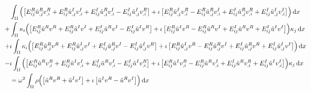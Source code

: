 \begin{align}
    & \int_{\Omega} {
        \Bigl(
            \left[
                E^R_{ij} \tilde{u}^R_{,j} v^R_{,i}
                + E^R_{ij} \tilde{u}^I_{,j} v^I_{,i}
                + E^I_{ij} \tilde{u}^R_{,j} v^I_{,i}
                - E^I_{ij} \tilde{u}^I_{,j} v^R_{,i}
            \right]
            + \iota \left[
                E^R_{ij} \tilde{u}^I_{,j} v^R_{,i}
                - E^R_{ij} \tilde{u}^R_{,j} v^I_{,i}
                + E^I_{ij} \tilde{u}^R_{,j} v^R_{,i}
                + E^I_{ij} \tilde{u}^I_{,j} v^I_{,i}
            \right]
        \Bigr)
        \,\mathrm{d}x
    } \nonumber \\
    +& \int_{\Omega} {
        \kappa_{i} \Bigl(
            \left[
                E^R_{ij} \tilde{u}^R v^R
                + E^R_{ij} \tilde{u}^I v^I
                + E^I_{ij} \tilde{u}^R v^I
                - E^I_{ij} \tilde{u}^I v^R
                \right]
                + \iota \left[
                E^R_{ij} \tilde{u}^I v^R
                - E^R_{ij} \tilde{u}^R v^I
                + E^I_{ij} \tilde{u}^R v^R
                + E^I_{ij} \tilde{u}^I v^I
            \right]
        \Bigr)
        \kappa_{j}
        \,\mathrm{d}x
    } \nonumber \\
    +& \iota \int_{\Omega} {
        \kappa_{i} \Bigl(
            \left[
                E^R_{ij} \tilde{u}^R_{,j} v^R
                + E^R_{ij} \tilde{u}^I_{,j} v^I
                + E^I_{ij} \tilde{u}^R_{,j} v^I
                - E^I_{ij} \tilde{u}^I_{,j} v^R
            \right]
            + \iota \left[
                E^R_{ij} \tilde{u}^I_{,j} v^R
                - E^R_{ij} \tilde{u}^R_{,j} v^I
                + E^I_{ij} \tilde{u}^R_{,j} v^R
                + E^I_{ij} \tilde{u}^I_{,j} v^I
            \right]
        \Bigr)
        \,\mathrm{d}x
    } \nonumber \\
    -& \iota \int_{\Omega} {
        \Bigl(
            \left[
                E^R_{ij} \tilde{u}^R v^R_{,i}
                + E^R_{ij} \tilde{u}^I v^I_{,i}
                + E^I_{ij} \tilde{u}^R v^I_{,i}
                - E^I_{ij} \tilde{u}^I v^R_{,i}
            \right]
            + \iota \left[
                E^R_{ij} \tilde{u}^I v^R_{,i}
                - E^R_{ij} \tilde{u}^R v^I_{,i}
                + E^I_{ij} \tilde{u}^R v^R_{,i}
                + E^I_{ij} \tilde{u}^I v^I_{,i}
            \right]
        \Bigr) \kappa_{j}
        \,\mathrm{d}x
    } \nonumber \\
    &= \omega^2 \int_{\Omega} {
        \rho
        \Bigl(
            \left[
                \tilde{u}^R v^R + \tilde{u}^I v^I
            \right]
            + \iota \left[
                \tilde{u}^I v^R - \tilde{u}^R v^I
            \right]
        \Bigr)
        \,\mathrm{d}x
    } \nonumber
\end{align}
